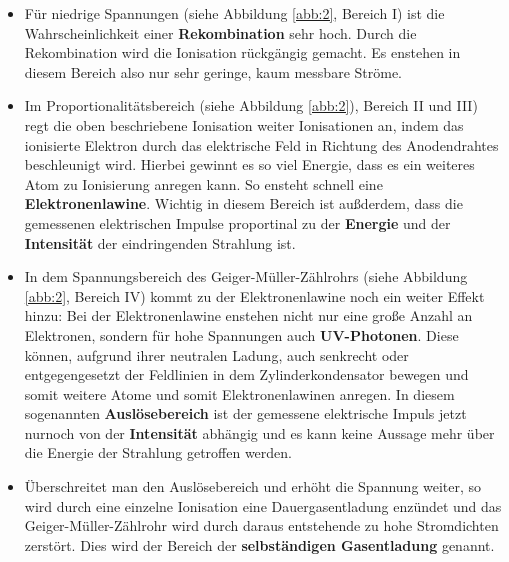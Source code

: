\begin{itemize}
  \item Für niedrige Spannungen (siehe Abbildung \ref{abb:2}, Bereich I) ist die Wahrscheinlichkeit einer \textbf{Rekombination} sehr hoch. Durch die Rekombination
  wird die Ionisation rückgängig gemacht. Es enstehen in diesem Bereich also nur sehr geringe, kaum messbare Ströme.
  \item Im Proportionalitätsbereich (siehe Abbildung \ref{abb:2}), Bereich II und III) regt die oben beschriebene Ionisation weiter Ionisationen an, indem
  das ionisierte Elektron durch das elektrische Feld in Richtung des Anodendrahtes beschleunigt wird. Hierbei gewinnt es so viel Energie, dass
  es ein weiteres Atom zu Ionisierung anregen kann. So ensteht schnell eine \textbf{Elektronenlawine}. Wichtig in diesem Bereich ist außderdem, dass die gemessenen
  elektrischen Impulse proportinal zu der \textbf{Energie} und der \textbf{Intensität} der eindringenden Strahlung ist.
  \item In dem Spannungsbereich des Geiger-Müller-Zählrohrs (siehe Abbildung \ref{abb:2}, Bereich IV) kommt zu der Elektronenlawine noch ein weiter Effekt hinzu:
  Bei der Elektronenlawine enstehen nicht nur eine große Anzahl an Elektronen, sondern für hohe Spannungen auch \textbf{UV-Photonen}. Diese können, aufgrund ihrer
  neutralen Ladung, auch senkrecht oder entgegengesetzt der Feldlinien in dem Zylinderkondensator bewegen und somit weitere Atome und somit Elektronenlawinen anregen.
  In diesem sogenannten \textbf{Auslösebereich} ist der gemessene elektrische Impuls jetzt nurnoch von der \textbf{Intensität} abhängig und es kann keine Aussage mehr
  über die Energie der Strahlung getroffen werden.
  \item Überschreitet man den Auslösebereich und erhöht die Spannung weiter, so wird durch eine einzelne Ionisation eine Dauergasentladung enzündet und
  das Geiger-Müller-Zählrohr wird durch daraus entstehende zu hohe Stromdichten zerstört. Dies wird der Bereich der \textbf{selbständigen Gasentladung} genannt.
\end{itemize}
